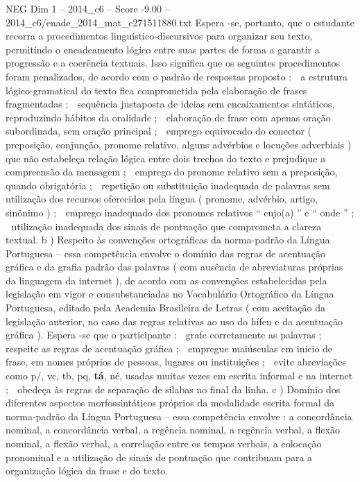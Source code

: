 \begin{textsample}{NEG Dim 1 – 2014\_c6 – Score -9.00 – 2014\_c6/enade\_2014\_mat\_c271511880.txt}
Espera -se, portanto, que o estudante recorra a procedimentos linguístico-discursivos para organizar seu texto, permitindo o encadeamento lógico entre suas partes de forma a garantir a progressão e a coerência textuais.
Isso significa que os seguintes procedimentos foram penalizados, de acordo com o padrão de respostas proposto :  a estrutura lógico-gramatical do texto fica comprometida pela elaboração de frases fragmentadas ;  sequência justaposta de ideias sem encaixamentos sintáticos, reproduzindo hábitos da oralidade ;  elaboração de frase com apenas oração subordinada, sem oração principal ;  emprego equivocado do conector ( preposição, conjunção, pronome relativo, alguns advérbios e locuções adverbiais ) que não estabeleça relação lógica entre dois trechos do texto e prejudique a compreensão da mensagem ;  emprego do pronome relativo sem a preposição, quando obrigatória ;  repetição ou substituição inadequada de palavras sem utilização dos recursos oferecidos pela língua ( pronome, advérbio, artigo, sinônimo ) ;  emprego inadequado dos pronomes relativos “ cujo(a) ” e “ onde ” ;  utilização inadequada dos sinais de pontuação que comprometa a clareza textual. b ) Respeito às convenções ortográficas da norma-padrão da Língua Portuguesa – essa competência envolve o domínio das regras de acentuação gráfica e da grafia padrão das palavras ( com ausência de abreviaturas próprias da linguagem da internet ), de acordo com as convenções estabelecidas pela legislação em vigor e consubstanciadas no Vocabulário Ortográfico da Língua Portuguesa, editado pela Academia Brasileira de Letras ( com aceitação da legislação anterior, no caso das regras relativas ao uso do hífen e da acentuação gráfica ).
Espera -se que o participante :  grafe corretamente as palavras ;  respeite as regras de acentuação gráfica ;  empregue maiúsculas em início de frase, em nomes próprios de pessoas, lugares ou instituições ;  evite abreviações como p/, vc, tb, pq, \textbf{tá}, né, usadas muitas vezes em escrita informal e na internet ;  obedeça às regras de separação de sílabas no final da linha. c ) Domínio dos diferentes aspectos morfossintáticos próprios da modalidade escrita formal da norma-padrão da Língua Portuguesa – essa competência envolve : a concordância nominal, a concordância verbal, a regência nominal, a regência verbal, a flexão nominal, a flexão verbal, a correlação entre os tempos verbais, a colocação pronominal e a utilização de sinais de pontuação que contribuam para a organização lógica da frase e do texto.

\end{textsample}

